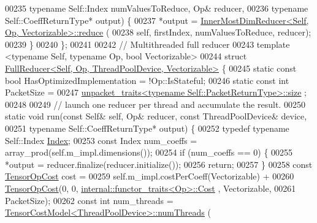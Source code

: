 \begin{DoxyCode}
00235                   \textcolor{keyword}{typename} Self::Index numValuesToReduce, Op& reducer,
00236                   \textcolor{keyword}{typename} Self::CoeffReturnType* output) \{
00237     *output = \hyperlink{struct_eigen_1_1internal_1_1_inner_most_dim_reducer}{InnerMostDimReducer<Self, Op, Vectorizable>::reduce}
      (
00238         \textcolor{keyword}{self}, firstIndex, numValuesToReduce, reducer);
00239   \}
00240 \};
00241 
00242 \textcolor{comment}{// Multithreaded full reducer}
00243 \textcolor{keyword}{template} <\textcolor{keyword}{typename} Self, \textcolor{keyword}{typename} Op, \textcolor{keywordtype}{bool} Vectorizable>
00244 \textcolor{keyword}{struct }\hyperlink{struct_eigen_1_1internal_1_1_full_reducer}{FullReducer<Self, Op, ThreadPoolDevice, Vectorizable>}
       \{
00245   \textcolor{keyword}{static} \textcolor{keyword}{const} \textcolor{keywordtype}{bool} HasOptimizedImplementation = !Op::IsStateful;
00246   \textcolor{keyword}{static} \textcolor{keyword}{const} \textcolor{keywordtype}{int} PacketSize =
00247       \hyperlink{struct_eigen_1_1internal_1_1unpacket__traits}{unpacket\_traits<typename Self::PacketReturnType>::size}
      ;
00248 
00249   \textcolor{comment}{// launch one reducer per thread and accumulate the result.}
00250   \textcolor{keyword}{static} \textcolor{keywordtype}{void} run(\textcolor{keyword}{const} Self& \textcolor{keyword}{self}, Op& reducer, \textcolor{keyword}{const} ThreadPoolDevice& device,
00251                   \textcolor{keyword}{typename} Self::CoeffReturnType* output) \{
00252     \textcolor{keyword}{typedef} \textcolor{keyword}{typename} Self::Index \hyperlink{namespace_eigen_a62e77e0933482dafde8fe197d9a2cfde}{Index};
00253     \textcolor{keyword}{const} Index num\_coeffs = array\_prod(\textcolor{keyword}{self}.m\_impl.dimensions());
00254     \textcolor{keywordflow}{if} (num\_coeffs == 0) \{
00255       *output = reducer.finalize(reducer.initialize());
00256       \textcolor{keywordflow}{return};
00257     \}
00258     \textcolor{keyword}{const} \hyperlink{class_eigen_1_1_tensor_op_cost}{TensorOpCost} cost =
00259         \textcolor{keyword}{self}.m\_impl.costPerCoeff(Vectorizable) +
00260         \hyperlink{class_eigen_1_1_tensor_op_cost}{TensorOpCost}(0, 0, \hyperlink{struct_eigen_1_1internal_1_1functor__traits}{internal::functor\_traits<Op>::Cost}
      , Vectorizable,
00261                      PacketSize);
00262     \textcolor{keyword}{const} \textcolor{keywordtype}{int} num\_threads = \hyperlink{class_eigen_1_1_tensor_cost_model}{TensorCostModel<ThreadPoolDevice>::numThreads}
      (

\end{DoxyCode}
